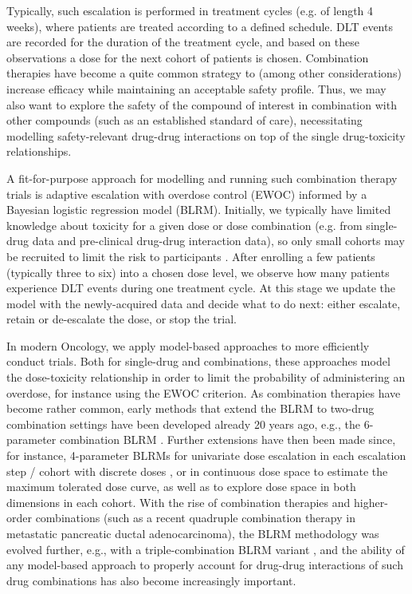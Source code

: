 \documentclass[AMA,STIX1COL]{WileyNJD-v2}
\newcommand{\revision}[1]{#1}
\begin{document}
Typically, such escalation is performed in treatment cycles (e.g. of length 4 weeks), where patients are treated according to a defined schedule. DLT events are recorded for the duration of the treatment cycle, and based on these observations a dose for the next cohort of patients is chosen. Combination therapies have become a quite common strategy to (among other considerations) increase efficacy \cite{Mokhtari2017, Palmer2017} while maintaining an acceptable safety profile. Thus, we may also want to explore the safety of the compound of interest in combination with other compounds (such as an established standard of care), necessitating modelling safety-relevant drug-drug interactions on top of the single drug-toxicity relationships.

A fit-for-purpose approach for modelling and running such combination therapy trials is adaptive escalation with overdose control (EWOC) informed by a Bayesian logistic regression model (BLRM)\cite{Neuenschwander2014}. Initially, we typically have limited knowledge about toxicity for a given dose or dose combination (e.g. from single-drug data and pre-clinical drug-drug interaction data), so only small cohorts may be recruited to limit the risk to participants \cite{Babb1998}. After enrolling a few patients (typically three to six) into a chosen dose level, we observe how many patients experience DLT events during one treatment cycle. At this stage we update the model with the newly-acquired data and decide what to do next: either escalate, retain or de-escalate the dose, or stop the trial. 

In modern Oncology, we apply model-based approaches to more efficiently conduct trials. Both for single-drug and combinations, these approaches model the dose-toxicity relationship in order to limit the probability of administering an overdose, for instance using the EWOC criterion. As combination therapies have become rather common\revision{, early methods that extend the BLRM to two-drug combination settings have been developed already 20 years ago, e.g., the 6-parameter combination BLRM \cite{Thall2003}. Further extensions have then been made since, for instance, 4-parameter BLRMs for univariate dose escalation in each escalation step / cohort with discrete doses \cite{Shi2013}, or in continuous dose space to estimate the maximum tolerated dose curve\cite{Tighiouart2014}, as well as to explore dose space in both dimensions in each cohort\cite{Tighiouart2017}. With the rise of combination therapies and higher-order combinations (such as a recent quadruple combination therapy in metastatic pancreatic ductal adenocarcinoma\cite{Wainberg2023}), the BLRM methodology was evolved further, e.g., with a triple-combination BLRM variant \cite{Tighiouart2016}, and} the ability of any model-based approach to properly account for drug-drug interactions of such drug combinations has also become increasingly important. 
\end{document}
